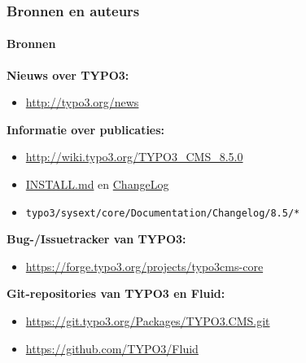 \begin{frame}[fragile]
	\frametitle{Bronnen en auteurs}
	\framesubtitle{Bronnen}

	\textbf{Nieuws over TYPO3:}
		\begin{itemize}\smaller
			\item \url{http://typo3.org/news}
		\end{itemize}

	\textbf{Informatie over publicaties:}
		\begin{itemize}\smaller
			\item \url{http://wiki.typo3.org/TYPO3_CMS_8.5.0}
			\item \href{https://github.com/TYPO3/TYPO3.CMS/blob/master/INSTALL.md}{INSTALL.md}
				en \href{https://github.com/TYPO3/TYPO3.CMS/tree/master/typo3/sysext/core/Documentation/Changelog}{ChangeLog}
			\item \texttt{typo3/sysext/core/Documentation/Changelog/8.5/*}
		\end{itemize}

	\textbf{Bug-/Issuetracker van TYPO3:}
		\begin{itemize}\smaller
			\item \url{https://forge.typo3.org/projects/typo3cms-core}
		\end{itemize}

	\textbf{Git-repositories van TYPO3 en Fluid:}
		\begin{itemize}\smaller
			\item \url{https://git.typo3.org/Packages/TYPO3.CMS.git}
			\item \url{https://github.com/TYPO3/Fluid}
		\end{itemize}

\end{frame}


